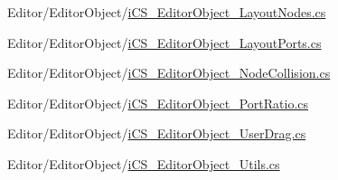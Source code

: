 \begin{DoxyCompactItemize}
Editor/\+Editor\+Object/\hyperlink{i_c_s___editor_object___layout_nodes_8cs}{i\+C\+S\+\_\+\+Editor\+Object\+\_\+\+Layout\+Nodes.\+cs}\item 
Editor/\+Editor\+Object/\hyperlink{i_c_s___editor_object___layout_ports_8cs}{i\+C\+S\+\_\+\+Editor\+Object\+\_\+\+Layout\+Ports.\+cs}\item 
Editor/\+Editor\+Object/\hyperlink{i_c_s___editor_object___node_collision_8cs}{i\+C\+S\+\_\+\+Editor\+Object\+\_\+\+Node\+Collision.\+cs}\item 
Editor/\+Editor\+Object/\hyperlink{i_c_s___editor_object___port_ratio_8cs}{i\+C\+S\+\_\+\+Editor\+Object\+\_\+\+Port\+Ratio.\+cs}\item 
Editor/\+Editor\+Object/\hyperlink{i_c_s___editor_object___user_drag_8cs}{i\+C\+S\+\_\+\+Editor\+Object\+\_\+\+User\+Drag.\+cs}\item 
Editor/\+Editor\+Object/\hyperlink{i_c_s___editor_object___utils_8cs}{i\+C\+S\+\_\+\+Editor\+Object\+\_\+\+Utils.\+cs}\end{DoxyCompactItemize}

